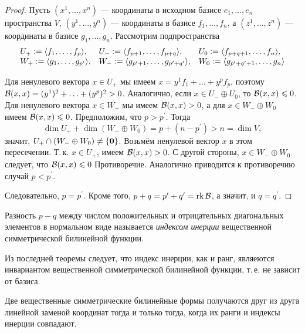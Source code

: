 \begin{proof}
    Пусть $(x^1, \ldots, x^n)$ --- координаты в исходном базисе $e_1, \ldots, e_n$ пространства $V$, $(y^1, \ldots, y^n)$ --- координаты в базисе $f_1, \ldots, f_n$, а $(z^1, \ldots, z^n)$ --- координаты в базисе $g_1, \ldots, g_n$. Рассмотрим подпространства
    \[
        \begin{array}{l l l}
            U_+ \vcentcolon = \langle f_1, \ldots, f_p \rangle, & U_- \vcentcolon = \langle f_{p + 1}, \ldots, f_{p + q} \rangle, & U_0 \vcentcolon = \langle f_{p + q + 1}, \ldots, f_n \rangle,\\
            W_+ \vcentcolon = \langle g_1, \ldots, g_{p^\prime} \rangle, & W_- \vcentcolon = \langle g_{p^\prime + 1}, \ldots, g_{p^\prime + q^\prime} \rangle, & W_0 \vcentcolon = \langle g_{p^\prime + q^\prime + 1}, \ldots, g_n \rangle
        \end{array}
    \]

    Для ненулевого вектора $x \in U_+$ мы имеем $x = y^1f_1 + \ldots + y^pf_p$, поэтому $\mathcal{B}(x, x) = (y^1)^2 + \ldots + (y^p)^2 > 0$. Аналогично, если $x \in U_- \oplus U_0$, то $\mathcal{B}(x, x) \leqslant 0$. Для ненулевого вектора $x \in W_+$ мы имеем $\mathcal{B}(x, x) > 0$, а для $x \in W_- \oplus W_0$ имеем $\mathcal{B}(x, x) \leqslant 0$. Предположим, что $p > p^\prime$. Тогда
    \[
        \dim U_+ + \dim(W_- \oplus W_0) = p + (n - p^\prime) > n = \dim V,
    \]
    значит, $U_+ \cap (W_- \oplus W_0) \ne \{\boldsymbol{0}\}$. Возьмём ненулевой вектор $x$ в этом пересечении. Т.\,к. $x \in U_+$, имеем $\mathcal{B}(x, x) > 0$. С другой стороны, $x \in W_- \oplus W_0$ следует, что $\mathcal{B}(x, x) \leqslant 0$ Противоречие. Аналогично приводится к противоречию случай $p < p^\prime$.

    Следовательно, $p = p^\prime$. Кроме того, $p + q = p^\prime + q^\prime = \operatorname{rk}\mathcal{B}$, а значит, и $q = q^\prime$.
\end{proof}

\begin{definition}
    Разность $p - q$ между числом положительных и отрицательных диагональных элементов в нормальном виде называется \textit{индексом инерции} вещественной симметрической билинейной функции.
\end{definition}

Из последней теоремы следует, что индекс инерции, как и ранг, являеются инвариантом вещественной симметрической билинейной функции, т.\,е. не зависит от базиса.

\begin{corollary}
    Две вещественные симметрические билинейные формы получаются друг из друга линейной заменой координат тогда и только тогда, когда их ранги и индексы инерции совпадают.
\end{corollary}

